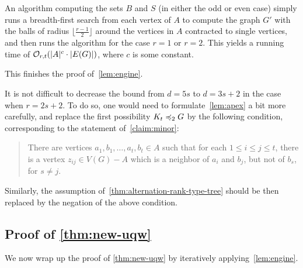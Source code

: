 \medskip
An algorithm computing the sets $B$ and $S$ (in either the odd or even case)
simply runs a breadth-first search from each vertex of $A$ to compute the graph $G'$ with the balls of radius  $\lfloor \frac{r-1}2 \rfloor$  around the vertices in $A$ contracted to single vertices, and then runs the algorithm for the case $r=1$ or $r=2$.
This yields a running time of  $\mathcal{O}_{r,t}(|A|^c\cdot |E(G)|)$, where $c$ is some constant.
 \medskip
  
This finishes  the proof of~\cref{lem:engine}.

\begin{remark}
	It is not difficult to decrease the bound from $d=5s$ to $d= 3s+2$
	in the  case when $r=2s+2$. To do so, one would need to formulate~\cref{lem:apex}
	a bit more carefully, and replace the first possibility $K_t\preccurlyeq_2 G$
	by the following condition, corresponding to the statement of~\cref{claim:minor}:
\begin{quote}
	There are vertices $a_1,b_1,\ldots,a_t,b_t\in A$ 
	such that for each $1\le i\le j\le t$, there is a vertex $z_{ij}\in V(G)-A$
	which is a neighbor of $a_i$ and $b_j$, but not of $b_s$, for $s\neq j$.	
\end{quote}
Similarly, the assumption of~\cref{thm:alternation-rank-type-tree}
should be then replaced by the negation of the above condition.
\end{remark}



\subsection*{Proof of \cref{thm:new-uqw}}
We now wrap up the proof of \cref{thm:new-uqw} by iteratively applying~\cref{lem:engine}.

